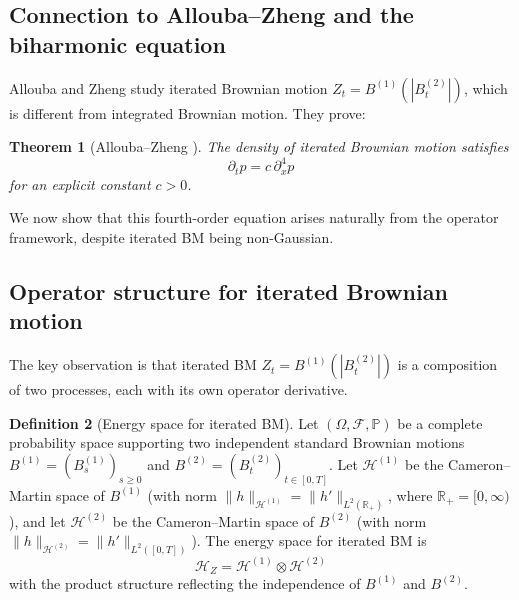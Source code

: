 \documentclass[12pt]{article}
\theoremstyle{plain}
\newtheorem{theorem}{Theorem}[section]
\theoremstyle{definition}
\newtheorem{definition}[theorem]{Definition}
\theoremstyle{remark}
\newcommand{\R}{\mathbb{R}}
\newcommand{\F}{\mathcal{F}}
\newcommand{\PP}{\mathbb{P}}
\newcommand{\HH}{\mathcal{H}}
\begin{document}
\subsection{Connection to Allouba--Zheng and the biharmonic equation}

Allouba and Zheng \cite{AlloubaZheng2001} study iterated Brownian motion $Z_t = B^{(1)}(|B_t^{(2)}|)$, which is different from integrated Brownian motion. They prove:

\begin{theorem}[Allouba--Zheng {\cite{AlloubaZheng2001}}]\label{thm:AZ}
The density of iterated Brownian motion satisfies
\begin{equation}\label{eq:AZ-biharmonic}
\partial_t p = c \, \partial_x^4 p
\end{equation}
for an explicit constant $c > 0$.
\end{theorem}

We now show that this fourth-order equation arises naturally from the operator framework, despite iterated BM being non-Gaussian.

\subsection{Operator structure for iterated Brownian motion}

The key observation is that iterated BM $Z_t = B^{(1)}(|B_t^{(2)}|)$ is a composition of two processes, each with its own operator derivative.

\begin{definition}[Energy space for iterated BM]\label{def:iterated-BM-energy}
Let $(\Omega, \F, \PP)$ be a complete probability space supporting two independent standard Brownian motions $B^{(1)} = (B_s^{(1)})_{s \geq 0}$ and $B^{(2)} = (B_t^{(2)})_{t \in [0,T]}$. Let $\HH^{(1)}$ be the Cameron--Martin space of $B^{(1)}$ (with norm $\|h\|_{\HH^{(1)}} = \|h'\|_{L^2(\R_+)}$, where $\R_+ = [0,\infty)$), and let $\HH^{(2)}$ be the Cameron--Martin space of $B^{(2)}$ (with norm $\|h\|_{\HH^{(2)}} = \|h'\|_{L^2([0,T])}$). The energy space for iterated BM is
\begin{equation}\label{eq:iterated-BM-energy}
\HH_Z = \HH^{(1)} \otimes \HH^{(2)}
\end{equation}
with the product structure reflecting the independence of $B^{(1)}$ and $B^{(2)}$.
\end{definition}
\end{document}
